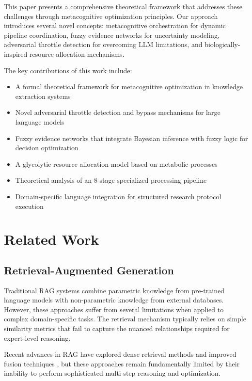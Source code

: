 \documentclass[12pt,a4paper]{article}
\begin{document}
This paper presents a comprehensive theoretical framework that addresses these challenges through metacognitive optimization principles. Our approach introduces several novel concepts: metacognitive orchestration for dynamic pipeline coordination, fuzzy evidence networks for uncertainty modeling, adversarial throttle detection for overcoming LLM limitations, and biologically-inspired resource allocation mechanisms.

The key contributions of this work include:

\begin{itemize}
\item A formal theoretical framework for metacognitive optimization in knowledge extraction systems
\item Novel adversarial throttle detection and bypass mechanisms for large language models
\item Fuzzy evidence networks that integrate Bayesian inference with fuzzy logic for decision optimization
\item A glycolytic resource allocation model based on metabolic processes
\item Theoretical analysis of an 8-stage specialized processing pipeline
\item Domain-specific language integration for structured research protocol execution
\end{itemize}

\section{Related Work}

\subsection{Retrieval-Augmented Generation}

Traditional RAG systems \cite{lewis2020retrieval} combine parametric knowledge from pre-trained language models with non-parametric knowledge from external databases. However, these approaches suffer from several limitations when applied to complex domain-specific tasks. The retrieval mechanism typically relies on simple similarity metrics that fail to capture the nuanced relationships required for expert-level reasoning.

Recent advances in RAG have explored dense retrieval methods \cite{karpukhin2020dense} and improved fusion techniques \cite{hofstatter2021efficiently}, but these approaches remain fundamentally limited by their inability to perform sophisticated multi-step reasoning and optimization.
\end{document}
